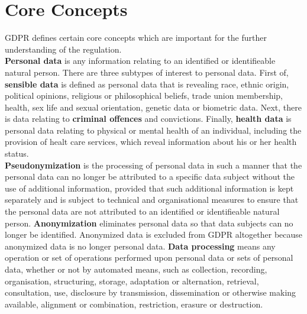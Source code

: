 \documentclass[a4paper,12pt]{report}
\begin{document}
	\section{Core Concepts}
	\startsection
	GDPR defines certain core concepts which are important for the further understanding of the regulation.\\
	\textbf{Personal data} is any information relating to an identified or identifieable natural person.
	There are three subtypes of interest to personal data. 
	First of, \textbf{sensible data} is defined as personal data that is revealing race, ethnic origin, political opinions, religious or philosophical beliefs, trade union membership, health, sex life and sexual orientation, genetic data or biometric data.
	Next, there is data relating to \textbf{criminal offences} and convictions.
	Finally, \textbf{health data} is personal data relating to physical or mental health of an individual, including the provision of healt care services, which reveal information about his or her health status.\\
	\textbf{Pseudonymization} is the processing of personal data in such a manner that the personal data can no longer be attributed to a specific data subject without the use of additional information, provided that such additional information is kept separately and is subject to technical and organisational measures to ensure that the personal data are not attributed to an identified or identifieable natural person.
	\textbf{Anonymization} eliminates personal data so that data subjects can no longer be identified. 
	Anonymized data is excluded from GDPR altogether because anonymized data is no longer personal data.
	\textbf{Data processing} means any operation or set of operations performed upon personal data or sets of personal data, whether or not by automated means, such as collection, recording, organisation, structuring, storage, adaptation or alternation, retrieval, consultation, use, disclosure by transmission, dissemination or otherwise making available, alignment or combination, restriction, erasure or destruction.
	\closesection
\end{document}
